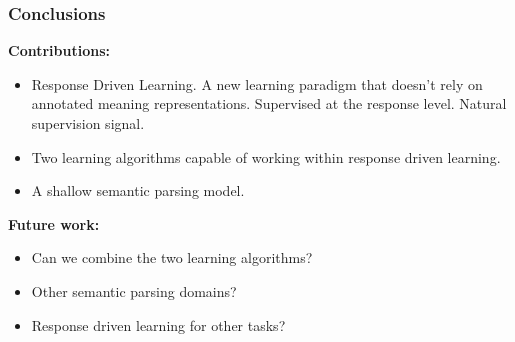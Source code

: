 \begin{frame}
  \frametitle{Conclusions}
  \textbf{Contributions:}
  \begin{itemize}
  \item Response Driven Learning. A new learning paradigm that doesn't rely on
    annotated meaning representations. Supervised at the response level. Natural
    supervision signal.
  \item Two learning algorithms capable of working within response driven
    learning.
  \item A shallow semantic parsing model.
  \end{itemize}

  \vspace{1ex}
  \textbf{Future work:}
  \begin{itemize}
  \item Can we combine the two learning algorithms?
  \item Other semantic parsing domains?
  \item Response driven learning for other tasks?
  \end{itemize}
\end{frame}

